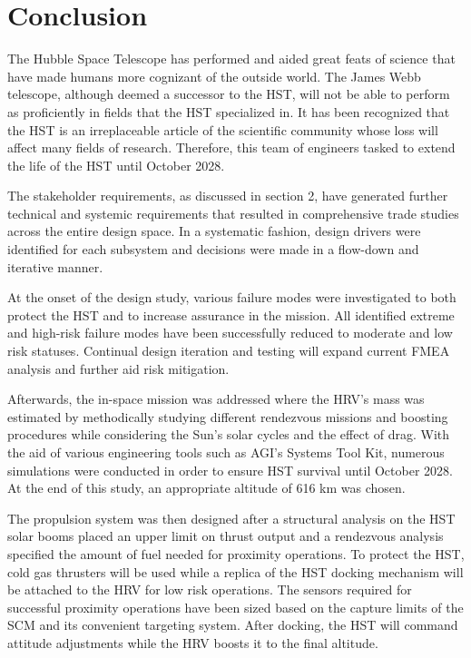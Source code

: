 \documentclass[paper=letter, fontsize=11pt]{scrartcl} %
\numberwithin{equation}{section} %
\numberwithin{figure}{section} %
\numberwithin{table}{section} %
\begin{document}
\section{Conclusion}

The Hubble Space Telescope has performed and aided great feats of science that have made humans more cognizant of the outside world. The James Webb telescope, although deemed a successor to the HST, will not be able to perform as proficiently in fields that the HST specialized in. It has been recognized that the HST is an irreplaceable article of the scientific community whose loss will affect many fields of research. Therefore, this team of engineers tasked to extend the life of the HST until October 2028.

The stakeholder requirements, as discussed in section 2, have generated further technical and systemic requirements that resulted in comprehensive trade studies across the entire design space. In a systematic fashion, design drivers were identified for each subsystem and decisions were made in a flow-down and iterative manner.

At the onset of the design study, various failure modes were investigated to both protect the HST and to increase assurance in the mission. All identified extreme and high-risk failure modes have been successfully reduced to moderate and low risk statuses. Continual design iteration and testing will expand current FMEA analysis and further aid risk mitigation.

Afterwards, the in-space mission was addressed where the HRV's mass was estimated by methodically studying different rendezvous missions and boosting procedures while considering the Sun's solar cycles and the effect of drag. With the aid of various engineering tools such as AGI's Systems Tool Kit, numerous simulations were conducted in order to ensure HST survival until October 2028. At the end of this study, an appropriate altitude of 616 km was chosen.

The propulsion system was then designed after a structural analysis on the HST solar booms placed an upper limit on thrust output and a rendezvous analysis specified the amount of fuel needed for proximity operations. To protect the HST, cold gas thrusters will be used while a replica of the HST docking mechanism will be attached to the HRV for low risk operations. The sensors required for successful proximity operations have been sized based on the capture limits of the SCM and its convenient targeting system.  After docking, the HST will command attitude adjustments while the HRV boosts it to the final altitude.
\end{document}
